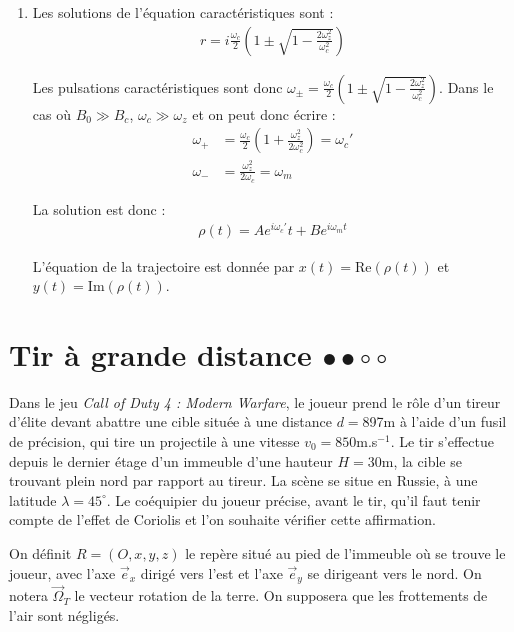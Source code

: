 \begin{correction}
\begin{enumerate}
\begin{enumerate}
		\item Les solutions de l'équation caractéristiques sont :
		\begin{align*}
			r=i\frac{\omega_c}{2}\left( 1 \pm\sqrt{1- \frac{2\omega_z^2}{\omega_c^2}}\right) 
		\end{align*}
		
		Les pulsations caractéristiques sont donc $\omega_\pm=\frac{\omega_c}{2}\left( 1 \pm\sqrt{1- \frac{2\omega_z^2}{\omega_c^2}}\right)$. Dans le cas où $B_0\gg B_c$, $\omega_c\gg\omega_z$ et on peut donc écrire :
		\begin{align*}
			\omega_+&=\frac{\omega_c}{2}\left( 1 +\frac{\omega_z^2}{2\omega_c^2}\right)= \omega_c'\\
			\omega_-&=\frac{\omega_z^2}{2\omega_c}=\omega_m
		\end{align*}
		
		La solution est donc :
		\begin{align*}
			\rho(t)=Ae^{i\omega_c'}t+Be^{i\omega_mt}
		\end{align*}
		
		L'équation de la trajectoire est donnée par $x(t)=\mathrm{Re}(\rho(t))$ et $y(t)=\mathrm{Im}(\rho(t))$.

\end{enumerate}
		
\end{enumerate}

\end{correction}

\newpage

\section{Tir à grande distance $\bullet\bullet\circ\circ$}

Dans le jeu \textit{Call of Duty 4 : Modern Warfare}, le joueur prend le rôle d'un tireur d'élite devant abattre une cible située à une distance $d=$897m à l'aide d'un fusil de précision, qui tire un projectile à une vitesse $v_0=850$m.s$^{-1}$. Le tir s'effectue depuis le dernier étage d'un immeuble d'une hauteur $H=30$m, la cible se trouvant plein nord par rapport au tireur. La scène se situe en Russie, à une latitude $\lambda=45^\circ$. Le coéquipier du joueur précise, avant le tir, qu'il faut tenir compte de l'effet de Coriolis et l'on souhaite vérifier cette affirmation.

On définit $R=(O,x,y,z)$ le repère situé au pied de l'immeuble où se trouve le joueur, avec l'axe $\vec{e}_x$ dirigé vers l'est et l'axe $\vec{e}_y$ se dirigeant vers le nord. On notera $\vec{\Omega}_T$ le vecteur rotation de la terre. On supposera que les frottements de l'air sont négligés.

